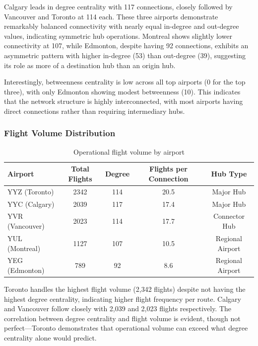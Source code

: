 \documentclass[9pt]{article}
\begin{document}
Calgary leads in degree centrality with 117 connections, closely followed by Vancouver and Toronto at 114 each. These three airports demonstrate remarkably balanced connectivity with nearly equal in-degree and out-degree values, indicating symmetric hub operations. Montreal shows slightly lower connectivity at 107, while Edmonton, despite having 92 connections, exhibits an asymmetric pattern with higher in-degree (53) than out-degree (39), suggesting its role as more of a destination hub than an origin hub.

Interestingly, betweenness centrality is low across all top airports (0 for the top three), with only Edmonton showing modest betweenness (10). This indicates that the network structure is highly interconnected, with most airports having direct connections rather than requiring intermediary hubs.

\subsubsection{Flight Volume Distribution}

\begin{table}[h!]
    \centering
    \caption{Operational flight volume by airport}
    \begin{tabular}{lcccc}
        \toprule
        Airport & Total Flights & Degree & Flights per Connection & Hub Type \\
        \midrule
        YYZ (Toronto)   & 2342 & 114 & 20.5 & Major Hub \\
        YYC (Calgary)   & 2039 & 117 & 17.4 & Major Hub \\
        YVR (Vancouver) & 2023 & 114 & 17.7 & Connector Hub \\
        YUL (Montreal)  & 1127 & 107 & 10.5 & Regional Airport \\
        YEG (Edmonton)  & 789  & 92  & 8.6  & Regional Airport \\
        \bottomrule
    \end{tabular}
\end{table}

Toronto handles the highest flight volume (2,342 flights) despite not having the highest degree centrality, indicating higher flight frequency per route. Calgary and Vancouver follow closely with 2,039 and 2,023 flights respectively. The correlation between degree centrality and flight volume is evident, though not perfect---Toronto demonstrates that operational volume can exceed what degree centrality alone would predict.
\end{document}
